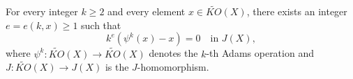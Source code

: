 For every integer $k \geq 2$ and every element $x \in \widetilde{KO}(X)$, there exists an integer $e = e(k, x) \geq 1$ such that
$$
k^{e}(\psi^{k}(x) - x) = 0 \quad \text{in } J(X),
$$
where $\psi^{k}: \widetilde{KO}(X) \to \widetilde{KO}(X)$ denotes the $k$-th Adams operation and $J: \widetilde{KO}(X) \to J(X)$ is the $J$-homomorphism.
